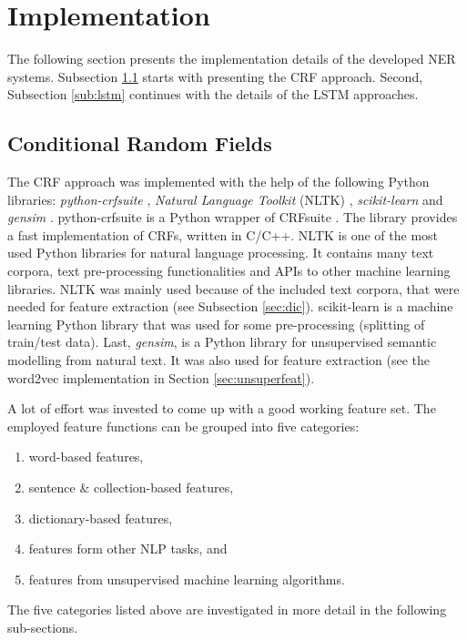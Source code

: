 \documentclass[12pt]{book}
\begin{document}
	
	\section{Implementation}
	
	The following section presents the implementation details of the developed NER systems. Subsection \ref{sub:CRF} starts with presenting the CRF approach. Second, Subsection \ref{sub:lstm} continues with the details of the LSTM approaches.
	
	\subsection{Conditional Random Fields}
	\label{sub:CRF}
	
	The CRF approach was implemented with the help of the following Python libraries: \textit{python-crfsuite} \cite{pycrfsuite}, \textit{Natural Language Toolkit} (NLTK) \cite{nltk}, \textit{scikit-learn} \cite{scikitlearn} and \textit{gensim} \cite{gensim}.
	python-crfsuite is a Python wrapper of CRFsuite \cite{CRFsuite}. The library provides a fast implementation of CRFs, written in C/C++. NLTK is one of the most used Python libraries for natural language processing. It contains many text corpora, text pre-processing functionalities and APIs to other machine learning libraries. NLTK was mainly used because of the included text corpora, that were needed for feature extraction (see Subsection \ref{sec:dic}). scikit-learn is a machine learning Python library that was used for some pre-processing (splitting of train/test data). Last, \textit{gensim}, is a Python library for unsupervised semantic modelling from natural text. It was also used for feature extraction (see the word2vec implementation in Section \ref{sec:unsuperfeat}).
	
	A lot of effort was invested to come up with a good working feature set. The employed feature functions can be grouped into five categories: 
	\begin{enumerate}
		\item word-based features,
		\item sentence \& collection-based features,
		\item dictionary-based features, 
		\item features form other NLP tasks, and
		\item features from unsupervised machine learning algorithms.
	\end{enumerate}

	The five categories listed above are investigated in more detail in the following sub-sections.
\end{document}
